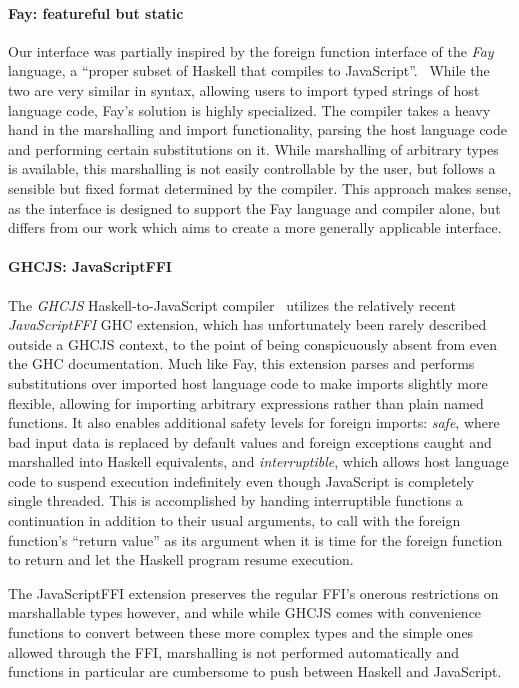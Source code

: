 \documentclass[preprint]{sigplanconf}
\begin{document}
\paragraph{Fay: featureful but static}
Our interface was partially inspired by the foreign function interface of the
\emph{Fay} language,
a ``proper subset of Haskell that compiles to JavaScript''.\ \cite{fay}
While the two are very similar in syntax, allowing users to import typed
strings of host language code, Fay's solution is highly specialized.
The compiler takes a heavy hand in the marshalling and import functionality,
parsing the host language code and performing certain substitutions on it.
While marshalling of arbitrary types is available, this marshalling is not
easily controllable by the user, but follows a sensible but fixed format
determined by the compiler.
This approach makes sense, as the interface is designed to support the Fay
language and compiler alone, but differs from our work which aims to create
a more generally applicable interface.

\paragraph{GHCJS: JavaScriptFFI}
The \emph{GHCJS} Haskell-to-JavaScript compiler\ \cite{ghcjs} utilizes the
relatively recent \emph{JavaScriptFFI} GHC extension,
which has unfortunately been rarely described outside a GHCJS context, to the
point of being conspicuously absent from even the GHC documentation.
Much like Fay, this extension parses and
performs substitutions over imported host language code to make imports
slightly more flexible, allowing for importing arbitrary expressions rather
than plain named functions.
It also enables additional safety levels for foreign
imports: \emph{safe}, where bad input data is replaced by default values and
foreign exceptions caught and marshalled into Haskell equivalents,
and \emph{interruptible}, which allows host language code to suspend execution
indefinitely even though JavaScript is completely single threaded.
This is accomplished by handing interruptible functions a continuation in
addition to their usual arguments, to call with the foreign function's
``return value'' as its argument when it is time for the foreign function
to return and let the Haskell program resume execution.

The JavaScriptFFI extension preserves the regular FFI's onerous restrictions
on marshallable types however, and while while GHCJS comes with convenience
functions to convert between these more complex types and the simple ones
allowed through the FFI, marshalling is not performed automatically and
functions in particular are cumbersome to push between Haskell and JavaScript.
\end{document}
